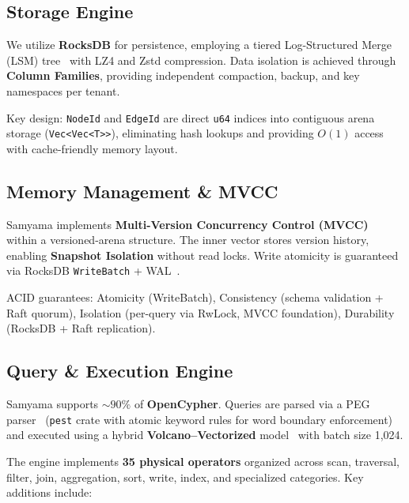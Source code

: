 \documentclass[11pt]{article}
\begin{document}
\subsection{Storage Engine}

We utilize \textbf{RocksDB} for persistence, employing a tiered Log-Structured Merge (LSM) tree~\citep{oneil1996lsm} with LZ4 and Zstd compression. Data isolation is achieved through \textbf{Column Families}, providing independent compaction, backup, and key namespaces per tenant.

Key design: \texttt{NodeId} and \texttt{EdgeId} are direct \texttt{u64} indices into contiguous arena storage (\texttt{Vec<Vec<T>>}), eliminating hash lookups and providing $O(1)$ access with cache-friendly memory layout.

\subsection{Memory Management \& MVCC}

Samyama implements \textbf{Multi-Version Concurrency Control (MVCC)}~\citep{bernstein1981mvcc} within a versioned-arena structure. The inner vector stores version history, enabling \textbf{Snapshot Isolation} without read locks. Write atomicity is guaranteed via RocksDB \texttt{WriteBatch} + WAL~\citep{mohan1992aries}.

ACID guarantees: Atomicity (WriteBatch), Consistency (schema validation + Raft quorum), Isolation (per-query via RwLock, MVCC foundation), Durability (RocksDB + Raft replication).

\subsection{Query \& Execution Engine}
\label{sec:query-engine}

Samyama supports ${\sim}90\%$ of \textbf{OpenCypher}. Queries are parsed via a PEG parser~\citep{ford2004peg} (\texttt{pest} crate with atomic keyword rules for word boundary enforcement) and executed using a hybrid \textbf{Volcano--Vectorized} model~\citep{graefe1994volcano} with batch size 1,024.

The engine implements \textbf{35 physical operators} organized across scan, traversal, filter, join, aggregation, sort, write, index, and specialized categories. Key additions include:
\end{document}
